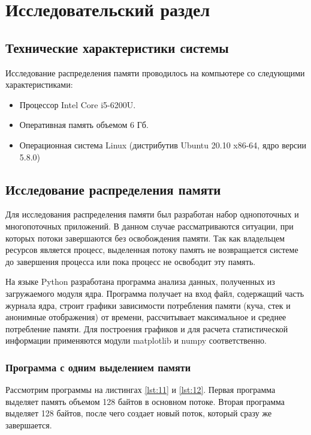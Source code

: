 \chapter{Исследовательский раздел}

\section{Технические характеристики системы}

Исследование распределения памяти проводилось на компьютере со следующими характеристиками:

\begin{itemize}
	\item Процессор Intel Core i5-6200U.
	\item Оперативная память объемом 6 Гб.
	\item Операционная система Linux (дистрибутив Ubuntu 20.10 x86-64, ядро версии 5.8.0)
\end{itemize}

\section{Исследование распределения памяти}

Для исследования распределения памяти был разработан набор однопоточных и многопоточных приложений. В данном случае рассматриваются ситуации, при которых потоки завершаются без освобождения памяти. Так как владельцем ресурсов является процесс, выделенная потоку память не возвращается системе до завершения процесса или пока процесс не освободит эту память.

На языке Python разработана программа анализа данных, полученных из загружаемого модуля ядра. Программа получает на вход файл, содержащий часть журнала ядра, строит графики зависимости потребления памяти (куча, стек и анонимные отображения) от времени, рассчитывает максимальное и среднее потребление памяти. Для построения графиков и для расчета статистической информации применяются модули matplotlib и numpy соответственно.

\subsection{Программа с одним выделением памяти}

Рассмотрим программы на листингах \ref{lst:11} и \ref{lst:12}. Первая программа выделяет память объемом 128 байтов в основном потоке. Вторая программа выделяет 128 байтов, после чего создает новый поток, который сразу же завершается.

